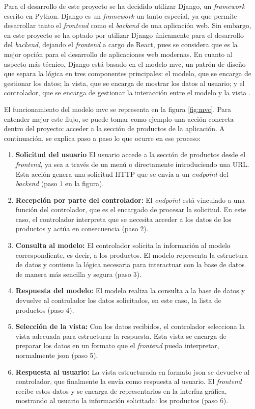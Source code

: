 Para el desarrollo de este proyecto se ha decidido utilizar Django, un \textit{framework} escrito en Python. Django es un \textit{framework} un tanto especial, ya que permite desarrollar tanto el \textit{frontend} como el \textit{backend} de una aplicación web. Sin embargo, en este proyecto se ha optado por utilizar Django únicamente para el desarrollo del \textit{backend}, dejando el \textit{frontend} a cargo de React, pues se considera que es la mejor opción para el desarrollo de aplicaciones web modernas. En cuanto al aspecto más técnico, Django está basado en el modelo \gls{mvc}, un patrón de diseño que separa la lógica en tres componentes principales: el modelo, que se encarga de gestionar los datos; la vista, que se encarga de mostrar los datos al usuario; y el controlador, que se encarga de gestionar la interacción entre el modelo y la vista \cite{mvc}.

El funcionamiento del modelo \gls{mvc} se representa en la figura \ref{fig:mvc}. Para entender mejor este flujo, se puede tomar como ejemplo una acción concreta dentro del proyecto: acceder a la sección de productos de la aplicación. A continuación, se explica paso a paso lo que ocurre en ese proceso:

\begin{enumerate}
    \item \textbf{Solicitud del usuario} El usuario accede a la sección de productos desde el \textit{frontend}, ya sea a través de un menú o directamente introduciendo una URL. Esta acción genera una solicitud HTTP que se envía a un \textit{endpoint} del \textit{backend} (paso 1 en la figura).
    \item \textbf{Recepción por parte del controlador:} El \textit{endpoint} está vinculado a una función del controlador, que es el encargado de procesar la solicitud. En este caso, el controlador interpreta que se necesita acceder a los datos de los productos y actúa en consecuencia (paso 2).
    \item \textbf{Consulta al modelo:} El controlador solicita la información al modelo correspondiente, es decir, a los productos. El modelo representa la estructura de datos y contiene la lógica necesaria para interactuar con la base de datos de manera más sencilla y segura (paso 3).
    \item \textbf{Respuesta del modelo:} El modelo realiza la consulta a la base de datos y devuelve al controlador los datos solicitados, en este caso, la lista de productos (paso 4).
    \item \textbf{Selección de la vista:} Con los datos recibidos, el controlador selecciona la vista adecuada para estructurar la respuesta. Esta vista se encarga de preparar los datos en un formato que el \textit{frontend} pueda interpretar, normalmente \gls{json} (paso 5).
    \item \textbf{Respuesta al usuario:} La vista estructurada en formato \gls{json} se devuelve al controlador, que finalmente la envía como respuesta al usuario. El \textit{frontend} recibe estos datos y se encarga de representarlos en la interfaz gráfica, mostrando al usuario la información solicitada: los productos (paso 6).
\end{enumerate}

